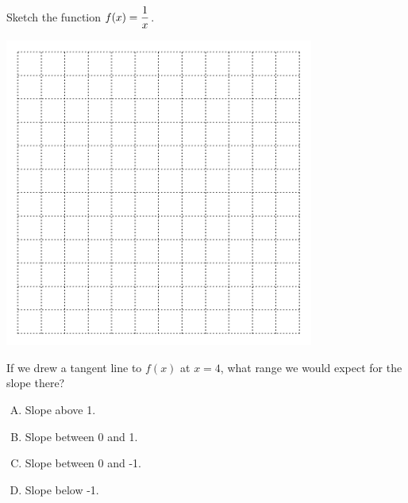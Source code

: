 

\newpage



\begin{problem}
Sketch the function $\displaystyle f(x)=\frac{1}{x}$.
\end{problem}

\includegraphics[width=4in]{graphics/empty_graph_square_12}

\newpage

\begin{problem}
If we drew a tangent line to $f(x)$ at $x=4$, what range we would expect for the slope there?

\begin{enumerate}[A.]
\item Slope above 1. \\[2ex]
\item Slope between 0 and 1.  \\[2ex]
\item Slope between 0 and -1.\\[2ex] 
\item Slope below -1.
\end{enumerate}
\end{problem}



